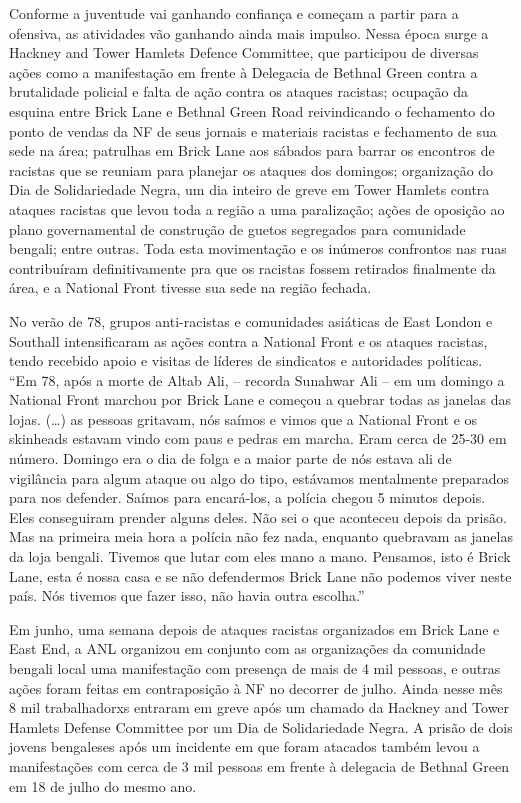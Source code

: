 Conforme a juventude vai ganhando confiança e começam a partir para a ofensiva, as atividades vão ganhando ainda mais impulso. Nessa época surge a Hackney and Tower Hamlets Defence Committee, que participou de diversas ações como a manifestação em frente à Delegacia de Bethnal Green contra a brutalidade policial e falta de ação contra os ataques racistas; ocupação da esquina entre Brick Lane e Bethnal Green Road reivindicando o fechamento do ponto de vendas da NF de seus jornais e materiais racistas e fechamento de sua sede na área; patrulhas em Brick Lane aos sábados para barrar os encontros de racistas que se reuniam para planejar os ataques dos domingos; organização do Dia de Solidariedade Negra, um dia inteiro de greve em Tower Hamlets contra ataques racistas que levou toda a região a uma paralização; ações de oposição ao plano governamental de construção de guetos segregados para comunidade bengali; entre outras. Toda esta movimentação e os inúmeros confrontos nas ruas contribuíram definitivamente pra que os racistas fossem retirados finalmente da área, e a National Front tivesse sua sede na região fechada.

No verão de 78, grupos anti-racistas e comunidades asiáticas de East London e Southall intensificaram as ações contra a National Front e os ataques racistas, tendo recebido apoio e visitas de líderes de sindicatos e autoridades políticas. “Em 78, após a morte de Altab Ali, – recorda Sunahwar Ali – em um domingo a National Front marchou por Brick Lane e começou a quebrar todas as janelas das lojas. (…) as pessoas gritavam, nós saímos e vimos que a National Front e os skinheads estavam vindo com paus e pedras em marcha. Eram cerca de 25-30 em número. Domingo era o dia de folga e a maior parte de nós estava ali de vigilância para algum ataque ou algo do tipo, estávamos mentalmente preparados para nos defender. Saímos para encará-los, a polícia chegou 5 minutos depois. Eles conseguiram prender alguns deles. Não sei o que aconteceu depois da prisão. Mas na primeira meia hora a polícia não fez nada, enquanto quebravam as janelas da loja bengali. Tivemos que lutar com eles mano a mano. Pensamos, isto é Brick Lane, esta é nossa casa e se não defendermos Brick Lane não podemos viver neste país. Nós tivemos que fazer isso, não havia outra escolha.”

Em junho, uma semana depois de ataques racistas organizados em Brick Lane e East End, a ANL organizou em conjunto com as organizações da comunidade bengali local uma manifestação com presença de mais de 4 mil pessoas, e outras ações foram feitas em contraposição à NF no decorrer de julho. Ainda nesse mês 8 mil trabalhadorxs entraram em greve após um chamado da Hackney and Tower Hamlets Defense Committee por um Dia de Solidariedade Negra. A prisão de dois jovens bengaleses após um incidente em que foram atacados também levou a manifestações com cerca de 3 mil pessoas em frente à delegacia de Bethnal Green em 18 de julho do mesmo ano.

